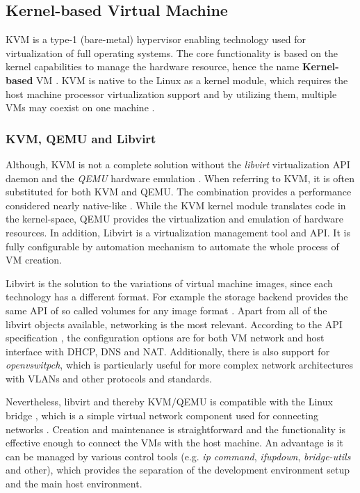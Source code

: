 \subsection{Kernel-based Virtual Machine \label{anal:virtual:kvm}}
KVM is a type-1 (bare-metal) hypervisor enabling technology used for virtualization of full operating systems. The core functionality is based on the kernel capabilities to manage the hardware resource, hence the name \textbf{Kernel-based} VM \cite{redhat:kvm}. KVM is native to the Linux as a kernel module, which requires the host machine processor virtualization support and by utilizing them, multiple VMs may coexist on one machine \cite{article:kvm_qemu}.

\subsubsection*{KVM, QEMU and Libvirt \label{anal:virtual:kvm:combined}}

Although, KVM is not a complete solution without the \textit{libvirt} virtualization API daemon and the \textit{QEMU} hardware emulation \cite{docs:qemu}. When referring to KVM, it is often substituted for both KVM and QEMU. The combination provides a performance considered nearly native-like \cite{article:kvm_qemu}. While the KVM kernel module translates code in the kernel-space, QEMU provides the virtualization and emulation of hardware resources. In addition, Libvirt is a virtualization management tool and API. It is fully configurable by automation mechanism to automate the whole process of VM creation.

Libvirt is the solution to the variations of virtual machine images, since each technology has a different format. For example the storage backend provides the same API of so called volumes for any image format \cite{docs:libvirt:volume}. Apart from all of the libvirt objects available, networking is the most relevant. According to the API specification \cite{docs:libvirt:network}, the configuration options are for both VM network and host interface with DHCP, DNS and NAT. Additionally, there is also support for \textit{openvswitpch}, which is particularly useful for more complex network architectures with VLANs and other protocols and standards.

Nevertheless, libvirt and thereby KVM/QEMU is compatible with the Linux bridge \cite{docs:libvirt:network}, which is a simple virtual network component used for connecting networks \cite{docs:arch:bridge}. Creation and maintenance is straightforward and the functionality is effective enough to connect the VMs with the host machine. An advantage is it can be managed by various control tools (e.g. \textit{ip command}, \textit{ifupdown}, \textit{bridge-utils} and other), which provides the separation of the development environment setup and the main host environment.


